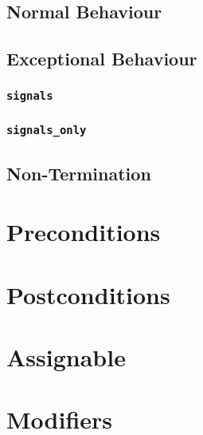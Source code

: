 \documentclass[a4paper, 11pt, accentcolor = tud3b]{tudreport}
\begin{document}
            \subsection{Normal Behaviour} %

            \subsection{Exceptional Behaviour} %

                \subsubsection{\texttt{signals}} %

                \subsubsection{\texttt{signals_only} } %

            \subsection{Non-Termination} %

        \section{Preconditions} %

        \section{Postconditions} %

        \section{Assignable} %

        \section{Modifiers} %
\end{document}

